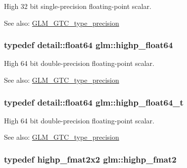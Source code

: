 High 32 bit single-precision floating-point scalar. \begin{Desc}
\item[See also:]\hyperlink{group__gtc__type__precision}{GLM\_\-GTC\_\-type\_\-precision} \end{Desc}
\hypertarget{group__gtc__type__precision_gb871a78c548d2fa53e1e8ec64a46eee7}{
\subsubsection[highp\_\-float64]{\setlength{\rightskip}{0pt plus 5cm}typedef detail::float64 {\bf glm::highp\_\-float64}}}
\label{group__gtc__type__precision_gb871a78c548d2fa53e1e8ec64a46eee7}


High 64 bit double-precision floating-point scalar. \begin{Desc}
\item[See also:]\hyperlink{group__gtc__type__precision}{GLM\_\-GTC\_\-type\_\-precision} \end{Desc}
\hypertarget{group__gtc__type__precision_ge8b3b2ace5be2a61c6bf63f12643fa15}{
\subsubsection[highp\_\-float64\_\-t]{\setlength{\rightskip}{0pt plus 5cm}typedef detail::float64 {\bf glm::highp\_\-float64\_\-t}}}
\label{group__gtc__type__precision_ge8b3b2ace5be2a61c6bf63f12643fa15}


High 64 bit double-precision floating-point scalar. \begin{Desc}
\item[See also:]\hyperlink{group__gtc__type__precision}{GLM\_\-GTC\_\-type\_\-precision} \end{Desc}
\hypertarget{group__gtc__type__precision_g10d47be18a81c111a8706d0a6df5b4ea}{
\subsubsection[highp\_\-fmat2]{\setlength{\rightskip}{0pt plus 5cm}typedef highp\_\-fmat2x2 {\bf glm::highp\_\-fmat2}}}
\label{group__gtc__type__precision_g10d47be18a81c111a8706d0a6df5b4ea}


